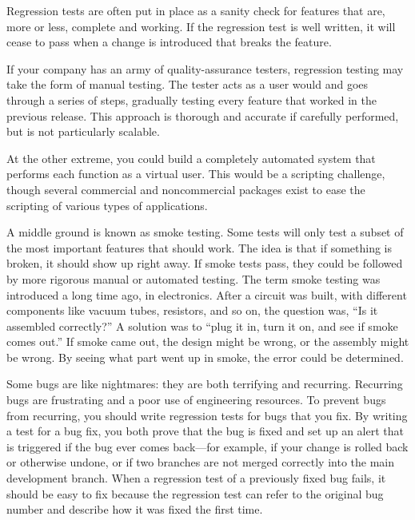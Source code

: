 Regression tests are often put in place as a sanity check for features that are, more or less, complete and working. If the regression test is well written, it will cease to pass when a change is introduced that breaks the feature.

If your company has an army of quality-assurance testers, regression testing may take the form of manual testing. The tester acts as a user would and goes through a series of steps, gradually testing every feature that worked in the previous release. This approach is thorough and accurate if carefully performed, but is not particularly scalable.

At the other extreme, you could build a completely automated system that performs each function as a virtual user. This would be a scripting challenge, though several commercial and noncommercial packages exist to ease the scripting of various types of applications.

A middle ground is known as smoke testing. Some tests will only test a subset of the most important features that should work. The idea is that if something is broken, it should show up right away. If smoke tests pass, they could be followed by more rigorous manual or automated testing. The term smoke testing was introduced a long time ago, in electronics. After a circuit was built, with different components like vacuum tubes, resistors, and so on, the question was, “Is it assembled correctly?” A solution was to “plug it in, turn it on, and see if smoke comes out.” If smoke came out, the design might be wrong, or the assembly might be wrong. By seeing what part went up in smoke, the error could be determined.

Some bugs are like nightmares: they are both terrifying and recurring. Recurring bugs are frustrating and a poor use of engineering resources. To prevent bugs from recurring, you should write regression tests for bugs that you fix. By writing a test for a bug fix, you both prove that the bug is fixed and set up an alert that is triggered if the bug ever comes back—for example, if your change is rolled back or otherwise undone, or if two branches are not merged correctly into the main development branch. When a regression test of a previously fixed bug fails, it should be easy to fix because the regression test can refer to the original bug number and describe how it was fixed the first time.






